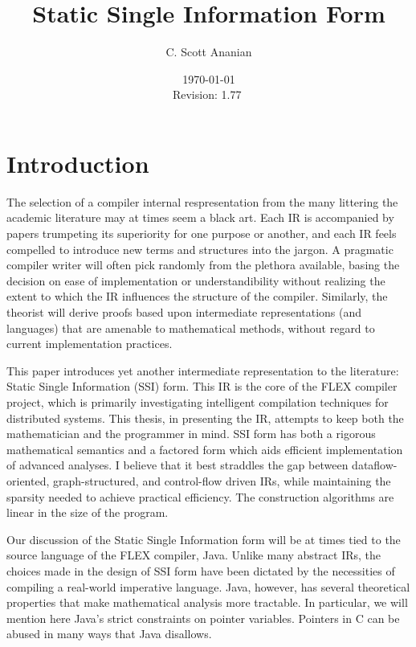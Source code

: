 \documentclass[12pt,titlepage,twoside]{article}
\title{Static Single Information Form
}
\author{C. Scott Ananian}
\date{\today \\ $ $Revision: 1.77 $ $}
\let\oldsection\section
\renewcommand{\section}{\setcounter{figure}{0}\setcounter{table}{0}\oldsection}
\begin{document}


\pagestyle{empty}
\maketitle\cleardoublepage
\pagestyle{myheadings}
\tableofcontents\listoffigures\listoftables\listofalgorithms\cleardoublepage
{}

\section{Introduction}
The selection of a compiler internal respresentation from the many
littering the academic literature may at times seem a black art.  Each
IR is accompanied by papers trumpeting its superiority for one purpose
or another, and each IR feels compelled to introduce new terms and
structures into the jargon.  A pragmatic compiler writer will often
pick randomly from the plethora available, basing the decision on ease
of implementation or understandibility without realizing the extent to
which the IR influences the structure of the compiler.  Similarly, the
theorist will derive proofs based upon intermediate representations
(and languages) that are amenable to mathematical methods, without
regard to current implementation practices.%

This paper introduces yet another intermediate
representation to the literature:  Static Single Information (SSI) form.
This IR is the core of the FLEX compiler project, which is primarily
investigating intelligent compilation techniques for distributed
systems.  This thesis, in presenting the IR,
attempts to keep both the mathematician and the programmer in mind.  
SSI form has both a rigorous mathematical semantics and a factored
form which aids efficient implementation of advanced analyses.
I believe that it best straddles the gap between dataflow-oriented,
graph-structured, and control-flow driven IRs, while maintaining the
sparsity needed to achieve practical efficiency.  The construction
algorithms are linear in the size of the program.

Our discussion of the Static Single Information form will be at times
tied to the source language of the FLEX compiler, Java.  Unlike many
abstract IRs, the choices made in the design of SSI form have been
dictated by the necessities of compiling a real-world imperative
language.  Java, however, has several theoretical properties that make
mathematical analysis more tractable.  In particular, we
will mention here Java's strict constraints on pointer variables.
Pointers in C can be abused in many ways that Java disallows.
\end{document}
